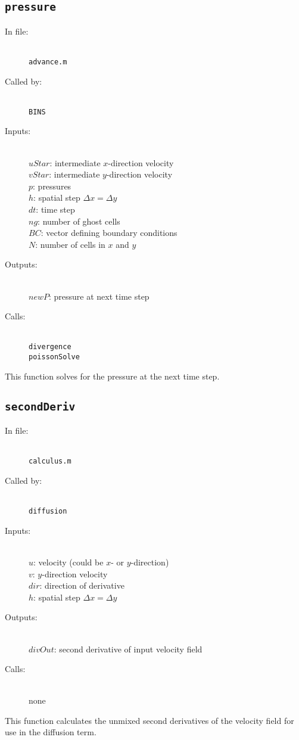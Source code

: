 \documentclass[12pt]{article}
\begin{document}
\subsection{\texttt{pressure}}
\begin{description}
\item[In file:] \hfill \\ \texttt{advance.m}
\item[Called by:] \hfill \\ \texttt{BINS}
\item[Inputs:] \hfill \\ $uStar$: intermediate $x$-direction velocity \\ $vStar$: intermediate $y$-direction velocity \\ $p$: pressures \\ $h$: spatial step $\Delta x = \Delta y$ \\ $dt$: time step \\ $ng$: number of ghost cells \\ $BC$: vector defining boundary conditions \\ $N$: number of cells in $x$ and $y$
\item[Outputs:] \hfill \\ $newP$: pressure at next time step
\item[Calls:] \hfill \\ \texttt{divergence} \\ \texttt{poissonSolve}
\end{description}
This function solves for the pressure at the next time step.

\subsection{\texttt{secondDeriv}}
\begin{description}
\item[In file:] \hfill \\ \texttt{calculus.m}
\item[Called by:] \hfill \\ \texttt{diffusion}
\item[Inputs:] \hfill \\ $u$: velocity (could be $x$- or $y$-direction) \\ $v$: $y$-direction velocity \\ $dir$: direction of derivative  \\ $h$: spatial step $\Delta x = \Delta y$ 
\item[Outputs:] \hfill \\ $divOut$: second derivative of input velocity field
\item[Calls:] \hfill \\ none
\end{description}
This function calculates the unmixed second derivatives of the velocity field for use in the diffusion term.
\end{document}
